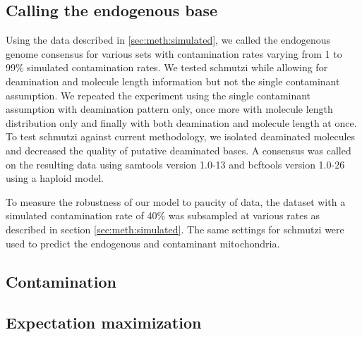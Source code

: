 \documentclass[a4paper,12pt]{article}
\begin{document}
\subsection{Calling the endogenous base}

Using the data described in \ref{sec:meth:simulated}, we called the endogenous genome consensus for various sets with contamination rates varying from 1 to 99\% simulated contamination rates. We tested schmutzi while allowing for deamination and molecule length information but not the single contaminant assumption. We repeated the experiment using the single contaminant assumption with deamination pattern only, once more with molecule length distribution only and finally with both deamination and molecule length at once. To test schmutzi against current methodology, we isolated deaminated molecules and decreased the quality of putative deaminated bases. A consensus was called on the resulting data using samtools version 1.0-13 and bcftools version 1.0-26  using a haploid model.


To measure the robustness of our model to paucity of data, the dataset with a simulated contamination rate of 40\% was subsampled at various rates as described in section \ref{sec:meth:simulated}. The same settings for schmutzi were used to predict the endogenous and contaminant mitochondria. 








%


\subsection{Contamination}


\subsection{Expectation maximization}

\end{document}
